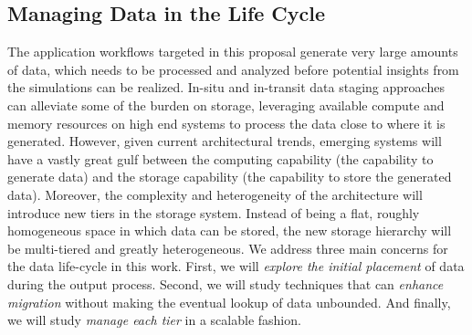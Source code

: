 \subsection{Managing Data in the Life Cycle}
\label{sec:managing-data-life}

\newcommand{\Sir}{Sirocco} %

The application workflows targeted in this proposal generate very large
amounts of data, which needs to be processed and analyzed before
potential insights from the simulations can be realized. 
In-situ and in-transit data staging approaches can alleviate some of the
burden on storage, leveraging available compute and memory resources on high
end systems to process the data close to where it is generated. 
However, given current architectural trends, emerging systems will have a
vastly great gulf between the computing capability (the capability to
generate data) and the storage capability (the capability to store the
generated data). Moreover, the complexity and heterogeneity of the
architecture will introduce new tiers in the storage system. Instead of
being a flat, roughly homogeneous space in which data can be stored, the new
storage hierarchy will be multi-tiered and greatly heterogeneous. 
%
We address three main concerns for the data life-cycle in this work. First,
we will {\it explore the initial placement} of data during the output process.
Second, we will study techniques that can {\it enhance migration} without making
the eventual lookup of data unbounded. And finally, we will study {\it manage each tier} in a scalable fashion. %

